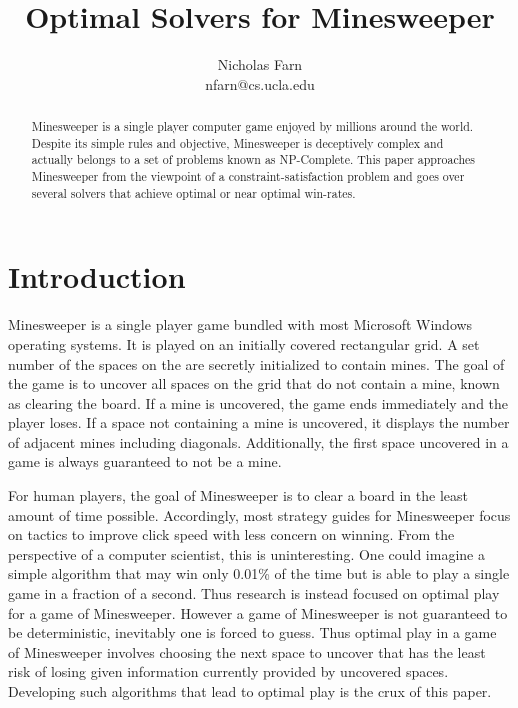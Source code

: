 \documentclass[letterpaper]{article}
\title{Optimal Solvers for Minesweeper}
\author{Nicholas Farn\\ nfarn@cs.ucla.edu}
\begin{document}
\maketitle

\begin{abstract}
Minesweeper is a single player computer game enjoyed by millions around the world.  Despite its simple rules and objective, Minesweeper is deceptively complex and actually belongs to a set of problems known as NP-Complete.  This paper approaches Minesweeper from the viewpoint of a constraint-satisfaction problem and goes over several solvers that achieve optimal or near optimal win-rates.
\end{abstract}

\section{Introduction}
Minesweeper is a single player game bundled with most Microsoft Windows operating systems.  It is played on an initially covered rectangular grid.  A set number of the spaces on the are secretly initialized to contain mines.  The goal of the game is to uncover all spaces on the grid that do not contain a mine, known as clearing the board.  If a mine is uncovered, the game ends immediately and the player loses.  If a space not containing a mine is uncovered, it displays the number of adjacent mines including diagonals.  Additionally, the first space uncovered in a game is always guaranteed to not be a mine.

For human players, the goal of Minesweeper is to clear a board in the least amount of time possible.  Accordingly, most strategy guides for Minesweeper focus on tactics to improve click speed with less concern on winning.  From the perspective of a computer scientist, this is uninteresting.  One could imagine a simple algorithm that may win only 0.01\% of the time but is able to play a single game in a fraction of a second.  Thus research is instead focused on optimal play for a game of Minesweeper.  However a game of Minesweeper is not guaranteed to be deterministic, inevitably one is forced to guess.  Thus optimal play in a game of Minesweeper involves choosing the next space to uncover that has the least risk of losing given information currently provided by uncovered spaces.  Developing such algorithms that lead to optimal play is the crux of this paper.
\end{document}
